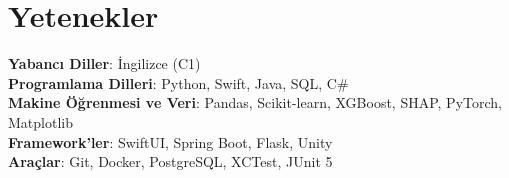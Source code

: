 \section{Yetenekler}
    \begin{itemize}[leftmargin=0.15in, label={}]
	\small{\item{
		\textbf{Yabancı Diller}{: İngilizce (C1)} \\
        \textbf{Programlama Dilleri}{: Python, Swift, Java, SQL, C\#} \\
		\textbf{Makine Öğrenmesi ve Veri}{: Pandas, Scikit-learn, XGBoost, SHAP, PyTorch, Matplotlib} \\
        \textbf{Framework'ler}{: SwiftUI, Spring Boot, Flask, Unity} \\
        \textbf{Araçlar}{: Git, Docker, PostgreSQL, XCTest, JUnit 5} \\
	}}
    \end{itemize}

